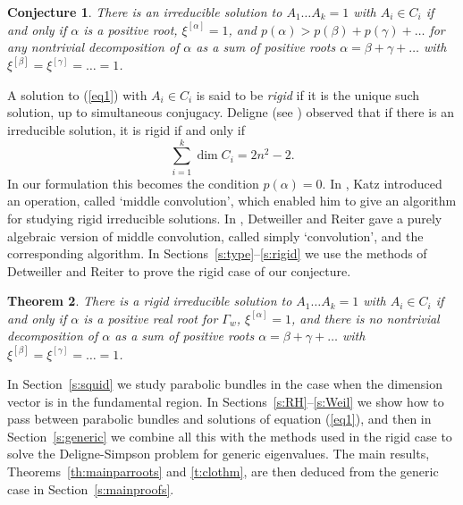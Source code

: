 \documentclass{amsart}
\theoremstyle{plain}
\newtheorem{thm}{Theorem}[section]
\newtheorem{conj}[thm]{Conjecture}
\theoremstyle{definition}
\theoremstyle{remark}
\begin{document}
\begin{conj}
There is an irreducible solution to $A_1\dots A_k = 1$ with $A_i\in C_i$
if and only if $\alpha$ is a positive root, $\xi^{[\alpha]}=1$, and
$p(\alpha) > p(\beta)+p(\gamma)+\dots$ for any nontrivial decomposition
of $\alpha$ as a sum of positive roots $\alpha = \beta+\gamma+\dots$
with $\xi^{[\beta]} = \xi^{[\gamma]} = \dots = 1$.
\end{conj}


A solution to (\ref{eq1}) with $A_i\in C_i$ is said to be \emph{rigid} if
it is the unique such solution, up to simultaneous conjugacy.
Deligne (see \cite[Lemma 6]{Simp}) observed that if there
is an irreducible solution, it is rigid if and only if
%
\begin{equation}\label{eq:desum}
\sum_{i=1}^k \dim C_i = 2n^2-2.
\end{equation}
%
In our formulation this becomes the condition $p(\alpha)=0$.
In \cite{Katz}, Katz introduced an operation, called `middle convolution',
which enabled him to give an algorithm for studying rigid irreducible solutions.
In \cite{DR}, Detweiller and Reiter gave a purely algebraic version
of middle convolution, called simply `convolution', and the corresponding algorithm.
In Sections~\ref{s:type}--\ref{s:rigid} we use the methods of Detweiller and Reiter
to prove the rigid case of our conjecture.


\begin{thm}\label{th:rigidcase}
There is a rigid irreducible solution to $A_1\dots A_k = 1$ with $A_i\in C_i$
if and only if $\alpha$ is a positive real root for $\Gamma_w$,
$\xi^{[\alpha]}=1$, and there is no nontrivial decomposition of $\alpha$ as a sum
of positive roots $\alpha = \beta+\gamma+\dots$
with $\xi^{[\beta]} = \xi^{[\gamma]} = \dots = 1$.
\end{thm}


In Section~\ref{s:squid} we study parabolic bundles in
the case when the dimension vector is in the fundamental region.
In Sections~\ref{s:RH}--\ref{s:Weil} we show how to pass between parabolic bundles
and solutions of equation (\ref{eq1}), and then in Section~\ref{s:generic} we
combine all this with the methods used in the rigid case to solve the Deligne-Simpson
problem for generic eigenvalues. The main results, Theorems~\ref{th:mainparroots}
and \ref{t:clothm}, are then deduced from the generic case in Section~\ref{s:mainproofs}.
\end{document}
